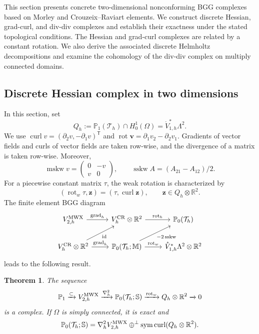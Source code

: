 \documentclass[10pt]{amsart}
\numberwithin{equation}{section}
\newtheorem{theorem}{Theorem}[section]
\newcommand{\curl}{\operatorname{curl}}
\newcommand{\grad}{\operatorname{grad}}
\newcommand{\rot}{\operatorname{rot}}
\newcommand{\sym}{\operatorname{sym}}
\newcommand{\mskw}{\operatorname{mskw}}
\newcommand{\sskw}{\operatorname{sskw}}
\begin{document}
This section presents concrete two-dimensional nonconforming BGG
complexes based on Morley and Crouzeix--Raviart elements. We construct
discrete Hessian, grad-curl, and div-div complexes and establish their
exactness under the stated topological conditions. The Hessian and
grad-curl complexes are related by a constant rotation. We also derive
the associated discrete Helmholtz decompositions and examine the
cohomology of the div-div complex on multiply connected domains.

\subsection{Discrete Hessian complex in two dimensions}
In this section, set
\[
Q_h:=\mathbb P_1(\mathcal T_h)\cap H_0^1(\Omega)
=\mathring V_{1,h}^*\Lambda^2.
\]
We use $\curl v=(\partial_2v,-\partial_1v)^{\mathsf T}$ and
$\rot\boldsymbol v=\partial_1v_2-\partial_2v_1$.
Gradients of vector fields and curls of vector fields are taken row-wise,
and the divergence of a matrix is taken row-wise. Moreover,
\[
\mskw v=\begin{pmatrix}0&-v\\v&0\end{pmatrix},\qquad
\sskw A=(A_{21}-A_{12})/2.
\]
For a piecewise constant matrix $\tau$, the weak rotation is characterized by
\[
(\rot_w\tau,\boldsymbol z)=(\tau,\curl\boldsymbol z),
\qquad \boldsymbol z\in Q_h\otimes\mathbb R^2.
\]
The finite element BGG diagram
\begin{equation*}
\begin{tikzcd}
V_{2,h}^{\rm MWX}
\arrow{r}{\grad_h}
 &
V_{h}^{\rm CR}\otimes\mathbb R^2
   \arrow{r}{\rot_h}
 &
\mathbb P_0(\mathcal T_h)
\\
V_{h}^{\rm CR}\otimes\mathbb R^2
 \arrow[ur,swap,"{\rm id}"] \arrow{r}{\grad_h}
 & 
\mathbb P_0(\mathcal T_h;\mathbb M) 
 \arrow[ur,swap,"{\rm -2\sskw}"] \arrow{r}{\rot_w}
 & \mathring{V}_{1,h}^{*}\Lambda^2\otimes\mathbb R^2
\end{tikzcd}
\end{equation*}
leads to the following result.
\begin{theorem}\label{thm:hessian2d}
The sequence
\begin{equation}\label{eq:hesscomplex2dfem}
\mathbb P_1\xrightarrow{\subset} V_{2,h}^{\rm MWX}\xrightarrow{\nabla_h^2}\mathbb P_0(\mathcal T_h;\mathbb S)\xrightarrow{\rot_w} Q_h\otimes\mathbb R^2\xrightarrow{}0
\end{equation}
is a complex. If $\Omega$ is simply connected, it is exact and
\begin{equation*}
\mathbb P_0(\mathcal T_h;\mathbb S)
=
\nabla_h^2 V_{2,h}^{\rm MWX}
\oplus^{\perp}
\sym\curl(Q_h\otimes\mathbb R^2).
\end{equation*}
\end{theorem}
\end{document}

